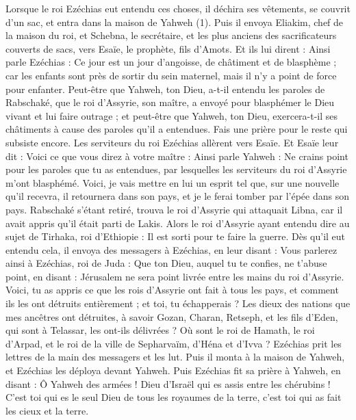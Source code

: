 \begin{multicols}{2}
\VerseOne{}Lorsque le roi Ezéchias eut entendu ces choses, il déchira ses vêtements, se couvrit d'un sac, et entra dans la maison de Yahweh (1).
Puis il envoya Eliakim, chef de la maison du roi, et Schebna, le secrétaire, et les plus anciens des sacrificateurs couverts de sacs, vers Esaïe, le prophète, fils d'Amots.
Et ils lui dirent : Ainsi parle Ezéchias : Ce jour est un jour d'angoisse, de châtiment et de blasphème ; car les enfants sont près de sortir du sein maternel, mais il n'y a point de force pour enfanter.
Peut-être que Yahweh, ton Dieu, a-t-il entendu les paroles de Rabschaké, que le roi d’Assyrie, son maître, a envoyé pour blasphémer le Dieu vivant et lui faire outrage ; et peut-être que Yahweh, ton Dieu, exercera-t-il ses châtiments à cause des paroles qu’il a entendues. Fais une prière pour le reste qui subsiste encore.
Les serviteurs du roi Ezéchias allèrent vers Esaïe.
Et Esaïe leur dit : Voici ce que vous direz à votre maître : Ainsi parle Yahweh : Ne crains point pour les paroles que tu as entendues, par lesquelles les serviteurs du roi d’Assyrie m'ont blasphémé.
Voici, je vais mettre en lui un esprit tel que, sur une nouvelle qu’il recevra, il retournera dans son pays, et je le ferai tomber par l'épée dans son pays.
Rabschaké s’étant retiré, trouva le roi d’Assyrie qui attaquait Libna, car il avait appris qu'il était parti de Lakis.
Alors le roi d’Assyrie ayant entendu dire au sujet de Tirhaka, roi d'Ethiopie : Il est sorti pour te faire la guerre. Dès qu’il eut entendu cela, il envoya des messagers à Ezéchias, en leur disant :
Vous parlerez ainsi à Ezéchias, roi de Juda : Que ton Dieu, auquel tu te confies, ne t'abuse point, en disant : Jérusalem ne sera point livrée entre les mains du roi d’Assyrie.
Voici, tu as appris ce que les rois d’Assyrie ont fait à tous les pays, et comment ils les ont détruits entièrement ; et toi, tu échapperais ?
Les dieux des nations que mes ancêtres ont détruites, à savoir Gozan, Charan, Retseph, et les fils d’Eden, qui sont à Telassar, les ont-ils délivrées ?
Où sont le roi de Hamath, le roi d'Arpad, et le roi de la ville de Sepharvaïm, d’Héna et d’Ivva ?
Ezéchias prit les lettres de la main des messagers et les lut. Puis il monta à la maison de Yahweh, et Ezéchias les déploya devant Yahweh.
Puis Ezéchias fit sa prière à Yahweh, en disant :
Ô Yahweh des armées ! Dieu d'Israël qui es assis entre les chérubins ! C’est toi qui es le seul Dieu de tous les royaumes de la terre, c’est toi qui as fait les cieux et la terre.

\end{multicols}
